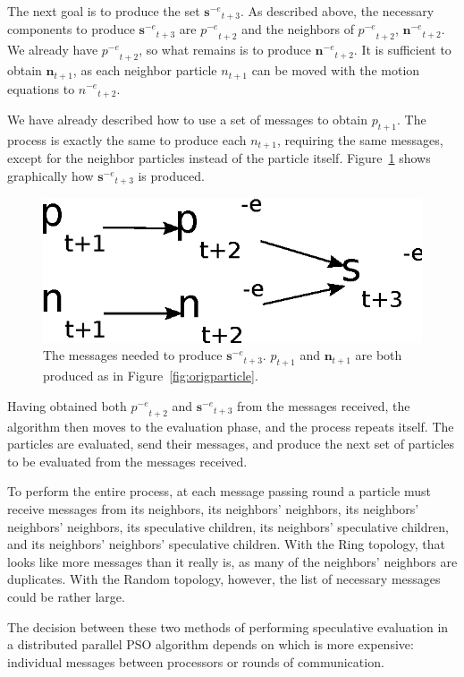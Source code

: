 \documentclass[conference,letterpaper]{IEEEtran}
\newcommand{\fig}[1]{Figure~\ref{fig:#1}}
\providecommand{\noeval}[1]{\ensuremath{#1^{-e}}}
\providecommand{\p}{\ensuremath{p}}
\providecommand{\sset}{\ensuremath{\mathbf{s}}}
\providecommand{\n}{\ensuremath{n}}
\providecommand{\nset}{\ensuremath{\mathbf{n}}}
\begin{document}
The next goal is to produce the set $\noeval{\sset}_{t+3}$.  As described
above, the necessary components to produce $\noeval{\sset}_{t+3}$ are
$\noeval{\p}_{t+2}$ and the neighbors of $\noeval{\p}_{t+2}$,
$\noeval{\nset}_{t+2}$.  We already have $\noeval{\p}_{t+2}$, so what remains
is to produce $\noeval{\nset}_{t+2}$.  It is sufficient to obtain
$\nset_{t+1}$, as each neighbor particle $\n_{t+1}$ can be moved with the
motion equations to $\noeval{\n}_{t+2}$.

We have already described how to use a set of messages to obtain $\p_{t+1}$.
The process is exactly the same to produce each $\n_{t+1}$, requiring the same
messages, except for the neighbor particles instead of the particle itself.  
\fig{specparticles} shows graphically how $\noeval{\sset}_{t+3}$ is produced.

\begin{figure}
  \centering
  \includegraphics[width=.6\columnwidth]{messages2.eps}
  \caption{The messages needed to produce $\noeval{\sset}_{t+3}$. $\p_{t+1}$
  and $\nset_{t+1}$ are both produced as in \fig{origparticle}.}
  \label{fig:specparticles}
\end{figure}

Having obtained both $\noeval{\p}_{t+2}$ and $\noeval{\sset}_{t+3}$ from the
messages received, the algorithm then moves to the evaluation phase, and the
process repeats itself.  The particles are evaluated, send their messages, and
produce the next set of particles to be evaluated from the messages received.

To perform the entire process, at each message passing round a particle must
receive messages from its neighbors, its neighbors' neighbors, its neighbors'
neighbors' neighbors, its speculative children, its neighbors' speculative
children, and its neighbors' neighbors' speculative children.  With the Ring
topology, that looks like more messages than it really is, as many of the
neighbors' neighbors are duplicates.  With the Random topology, however, the
list of necessary messages could be rather large.  

The decision between these two methods of performing speculative evaluation in
a distributed parallel PSO algorithm depends on which is more expensive: 
individual messages between processors or rounds of communication.
\end{document}
